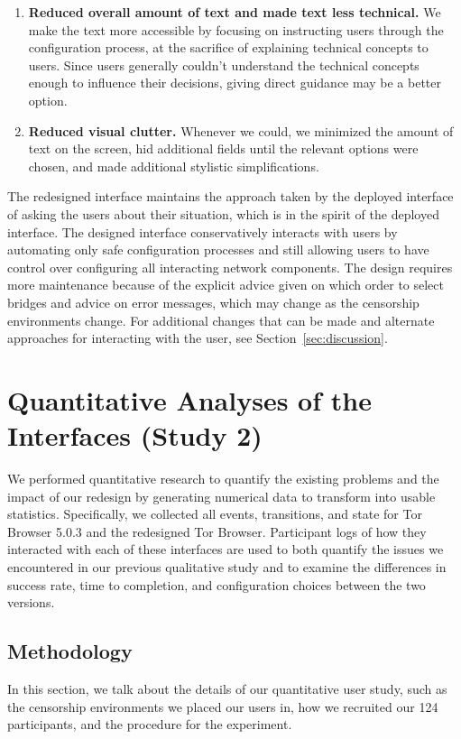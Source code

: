 \documentclass[USenglish,oneside,twocolumn]{article}
\begin{document}
\begin{enumerate}
\item {\bfseries Reduced overall amount of text and made text less technical.} We make the text more accessible by focusing on instructing users through the configuration process, at the sacrifice of explaining technical concepts to users. Since users generally couldn't understand the technical concepts enough to influence their decisions, giving direct guidance may be a better option.  
\item {\bfseries Reduced visual clutter.} Whenever we could, we minimized the amount of text on the screen, hid additional fields until the relevant options were chosen, and made additional stylistic simplifications. 
\end{enumerate} 

The redesigned interface maintains the approach taken by the deployed interface of asking the users about their situation, which is in the spirit of the deployed interface. The designed interface conservatively interacts with users by automating only safe configuration processes and still allowing users to have control over configuring all interacting network components. The design requires more maintenance because of the explicit advice given on which order to select bridges and advice on error messages, which may change as the censorship environments change. For additional changes that can be made and alternate approaches for interacting with the user, see Section~\ref{sec:discussion}. 

\section{Quantitative Analyses of the Interfaces (Study 2)}
\label{sec:quantitative}
We performed quantitative research to quantify the existing problems
and the impact of our redesign by generating numerical data to transform
into usable statistics. Specifically, we collected all events, transitions, 
and state for Tor Browser 5.0.3 and the redesigned Tor Browser. Participant
logs of how they interacted with each of these interfaces are used to both
quantify the issues we encountered in our previous qualitative 
study and to examine the differences in success rate, time to completion,
and configuration choices between the two versions. 

\subsection{Methodology} 
In this section, we talk about the details of our quantitative user study, such as the censorship environments we placed our users in, how we recruited our 124 participants, and the procedure for the experiment. 
\end{document}
